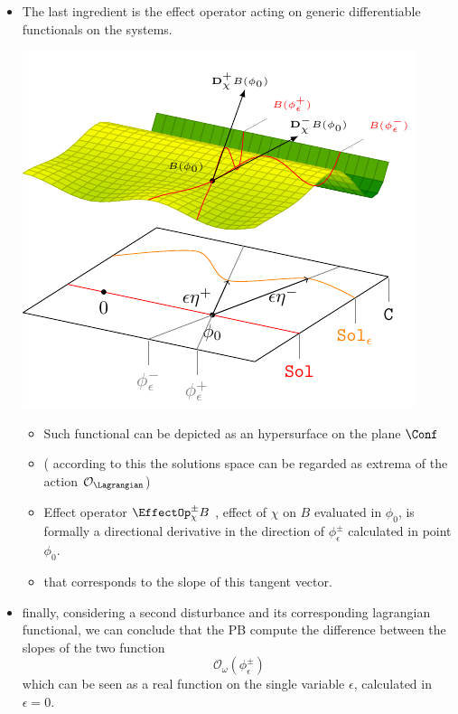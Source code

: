 \documentclass[a4paper,11pt]{scrartcl}
\begin{document}
\begin{itemize}
\item The last ingredient is the effect operator acting on generic differentiable functionals on the systems.\\
        \begin{minipage}{0.4\textwidth}
            \includegraphics[width=\textwidth]{../Pictures/GeometricPicture3}
        \end{minipage}
        \begin{minipage}{0.5\textwidth}
            \begin{itemize}
                \item  Such functional can be depicted as an hypersurface on the plane $\Conf$
                \item ( according to this the solutions space can be regarded as extrema of the action $\mathcal{O}_\Lagrangian$)
                \item Effect operator  $\EffectOp_\chi^\pm B$ , effect of $\chi$ on $B$ evaluated in $\phi_0$, is formally a directional derivative in the direction of $\phi_\epsilon^\pm$ calculated in point $\phi_0$.
                \item that corresponds to the slope of this tangent vector.
            \end{itemize}
        \end{minipage}
        \item finally, considering a second disturbance and its corresponding lagrangian functional, we can conclude that the PB compute the difference between the slopes of the two function $$\mathcal{O}_\omega ( \phi_\epsilon^\pm)$$ which can be seen as a real function on the single variable $\epsilon$, calculated in $\epsilon=0$.

\end{itemize}
\end{document}
